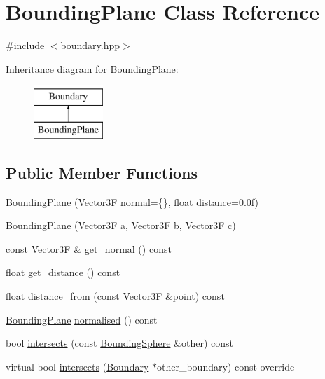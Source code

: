 \hypertarget{class_bounding_plane}{}\section{Bounding\+Plane Class Reference}
\label{class_bounding_plane}


{\ttfamily \#include $<$boundary.\+hpp$>$}

Inheritance diagram for Bounding\+Plane\+:\begin{figure}[H]
\begin{center}
\leavevmode
\includegraphics[height=2.000000cm]{class_bounding_plane}
\end{center}
\end{figure}
\subsection*{Public Member Functions}
\begin{DoxyCompactItemize}
\item 
\mbox{\hyperlink{class_bounding_plane_ad25000eaea20874698ae4b40bb84fb41}{Bounding\+Plane}} (\mbox{\hyperlink{class_vector3}{Vector3F}} normal=\{\}, float distance=0.\+0f)
\item 
\mbox{\hyperlink{class_bounding_plane_a24495ff7c5819bb37af4e971a077b7dd}{Bounding\+Plane}} (\mbox{\hyperlink{class_vector3}{Vector3F}} a, \mbox{\hyperlink{class_vector3}{Vector3F}} b, \mbox{\hyperlink{class_vector3}{Vector3F}} c)
\item 
const \mbox{\hyperlink{class_vector3}{Vector3F}} \& \mbox{\hyperlink{class_bounding_plane_a7c656534126a09de2768bffe9cdc5964}{get\+\_\+normal}} () const
\item 
float \mbox{\hyperlink{class_bounding_plane_ac34d406c0f223d599a7b7aad49d4cb54}{get\+\_\+distance}} () const
\item 
float \mbox{\hyperlink{class_bounding_plane_aae737d55629287d1f9f2598c8f81c09c}{distance\+\_\+from}} (const \mbox{\hyperlink{class_vector3}{Vector3F}} \&point) const
\item 
\mbox{\hyperlink{class_bounding_plane}{Bounding\+Plane}} \mbox{\hyperlink{class_bounding_plane_aa271e305ed07117a8c82eedf1fd0f037}{normalised}} () const
\item 
bool \mbox{\hyperlink{class_bounding_plane_af55931eb0667bcfaa91db85abcddc7a6}{intersects}} (const \mbox{\hyperlink{class_bounding_sphere}{Bounding\+Sphere}} \&other) const
\item 
virtual bool \mbox{\hyperlink{class_bounding_plane_a3d956121121f32384cab3cab34544d6e}{intersects}} (\mbox{\hyperlink{class_boundary}{Boundary}} $\ast$other\+\_\+boundary) const override
\end{DoxyCompactItemize}


